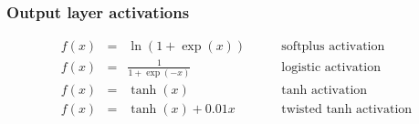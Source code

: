 \documentclass[10pt]{article}
\begin{document}
\subsubsection{\label{sect:outputact} Output layer activations}
% 
\begin{subequations}
\begin{align}
f(x) &= &\ln(1+\exp(x)) \qquad &\text{softplus activation}\label{eqn:softplus}\\
f(x) &= &\frac{1}{1+\exp(-x)} \qquad &\text{logistic activation} \label{eqn:logistic}\\
f(x) &= &\tanh(x) \qquad &\text{tanh activation} \label{eqn:tanh}\\
f(x) &= &\tanh(x) + 0.01x \qquad &\text{twisted tanh activation} \label{eqn:twisttanh}
\end{align}
\label{eqn:activations}
\end{subequations}
%
\end{document}
